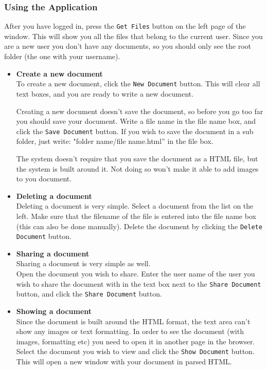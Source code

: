 \documentclass[11pt]{article}
\begin{document}
\subsubsection{Using the Application}
\label{sec-3-4-2}

After you have logged in, press the \texttt{Get Files} button on the left page of the window. 
This will show you all the files that belong to the current user. Since you are a new user you don't have any documents, so you should only see the root folder (the one with your username).
\begin{itemize}

\item \textbf{Create a new document}\\
\label{sec-3-4-2-1}%
To create a new document, click the \texttt{New Document} button. This will clear all text boxes, and you are ready to write a new document.

Creating a new document doesn't save the document, so before you go too far you should save your document.
Write a file name in the file name box, and click the \texttt{Save Document} button.
If you wish to save the document in a sub folder, just write: "folder name/file name.html'' in the file box.

The system doesn't require that you save the document as a HTML file, but the system is built around it. Not doing so won't make it able to add images to you document.

\item \textbf{Deleting a document} \\
\label{sec-3-4-2-2}%
Deleting a document is very simple.
Select a document from the list on the left. Make sure that the filename of the file is entered into the file name box (this can also be done manually). Delete the document by clicking the \texttt{Delete Document} button.

\item \textbf{Sharing a document} \\
\label{sec-3-4-2-3}%
Sharing a document is very simple as well. \\
Open the document you wish to share. Enter the user name of the user you wish to share the document with in the text box next to the \texttt{Share Document} button, and click the \texttt{Share Document} button.

\item \textbf{Showing a document} \\
\label{sec-3-4-2-4}%
Since the document is built around the HTML format, the text area can't show any images or text formatting.
In order to see the document (with images, formatting etc) you need to open it in another page in the browser.
Select the document you wish to view and click the \texttt{Show Document} button. This will open a new window with your document in parsed HTML.


\end{itemize}
\end{document}
